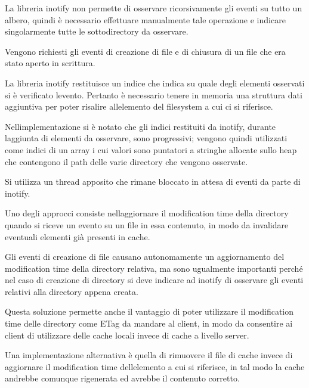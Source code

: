 \documentclass[a4paper,11pt]{article}
\begin{document}
{\sffamily
La libreria inotify non permette di osservare ricorsivamente gli eventi
su tutto un albero, quindi \`e necessario effettuare manualmente tale
operazione e indicare singolarmente tutte le sottodirectory da
osservare.}

{\sffamily
Vengono richiesti gli eventi di creazione di file e di chiusura di un
file che era stato aperto in scrittura.}


\bigskip

{\sffamily
La libreria inotify restituisce un indice che indica su quale degli
elementi osservati si \`e verificato l{\textquotesingle}evento.
Pertanto \`e necessario tenere in memoria una struttura dati aggiuntiva
per poter risalire all{\textquotesingle}elemento del filesystem a cui
ci si riferisce.}

{\sffamily
Nell{\textquotesingle}implementazione si \`e notato che gli indici
restituiti da inotify, durante l{\textquotesingle}aggiunta di elementi
da osservare, sono progressivi; vengono quindi utilizzati come indici
di un array i cui valori sono puntatori a stringhe allocate sullo heap
che contengono il path delle varie directory che vengono osservate.}


\bigskip

{\sffamily
Si utilizza un thread apposito che rimane bloccato in attesa di eventi
da parte di inotify.}


\bigskip

{\sffamily
Uno degli approcci consiste nell{\textquotesingle}aggiornare il
modification time della directory quando si riceve un evento su un file
in essa contenuto, in modo da invalidare eventuali elementi gi\`a
presenti in cache.}

{\sffamily
Gli eventi di creazione di file causano autonomamente un aggiornamento
del modification time della directory relativa, ma sono ugualmente
importanti perch\'e nel caso di creazione di directory si deve indicare
ad inotify di osservare gli eventi relativi alla directory appena
creata.}

{\sffamily
Questa soluzione permette anche il vantaggio di poter utilizzare il
modification time delle directory come ETag da mandare al client, in
modo da consentire ai client di utilizzare delle cache locali invece di
cache a livello server.}


\bigskip

{\sffamily
Una implementazione alternativa \`e quella di rimuovere il file di cache
invece di aggiornare il modification time
dell{\textquotesingle}elemento a cui si riferisce, in tal modo la cache
andrebbe comunque rigenerata ed avrebbe il contenuto corretto.}
\end{document}
